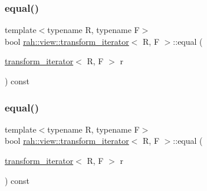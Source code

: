 \subsubsection{\texorpdfstring{equal()}{equal()}\hspace{0.1cm}{\footnotesize\ttfamily [1/2]}}
{\footnotesize\ttfamily template$<$typename R, typename F$>$ \\
bool \mbox{\hyperlink{structrah_1_1view_1_1transform__iterator}{rah\+::view\+::transform\+\_\+iterator}}$<$ R, F $>$\+::equal (\begin{DoxyParamCaption}\item[{\mbox{\hyperlink{structrah_1_1view_1_1transform__iterator}{transform\+\_\+iterator}}$<$ R, F $>$}]{r }\end{DoxyParamCaption}) const\hspace{0.3cm}{\ttfamily [inline]}}

\mbox{\label{structrah_1_1view_1_1transform__iterator_a68105373ae5ce99863589e17605f3833}} 
\subsubsection{\texorpdfstring{equal()}{equal()}\hspace{0.1cm}{\footnotesize\ttfamily [2/2]}}
{\footnotesize\ttfamily template$<$typename R, typename F$>$ \\
bool \mbox{\hyperlink{structrah_1_1view_1_1transform__iterator}{rah\+::view\+::transform\+\_\+iterator}}$<$ R, F $>$\+::equal (\begin{DoxyParamCaption}\item[{\mbox{\hyperlink{structrah_1_1view_1_1transform__iterator}{transform\+\_\+iterator}}$<$ R, F $>$}]{r }\end{DoxyParamCaption}) const\hspace{0.3cm}{\ttfamily [inline]}}

\mbox{\label{structrah_1_1view_1_1transform__iterator_a1ee5c30f733b63b1cd26baa121389dd1}} 
